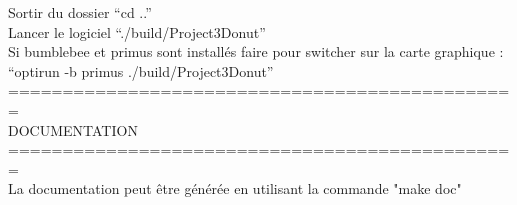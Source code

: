 \noindent Sortir du dossier ``cd ..''\\

\noindent Lancer le logiciel ``./build/Project3Donut''\\

\noindent Si bumblebee et primus sont installés faire pour switcher sur la carte graphique : ``optirun -b primus ./build/Project3Donut''\\

\noindent ===============================================\\
\noindent DOCUMENTATION\\
\noindent ===============================================\\
\noindent La documentation peut être générée en utilisant la commande "make doc"\\
